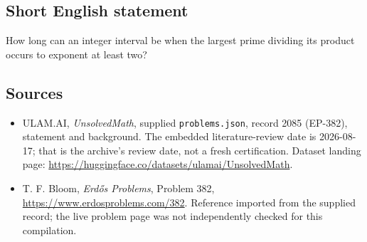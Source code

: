\documentclass[11pt,a4paper]{article}
\begin{document}
\subsection{Short English statement}

How long can an integer interval be when the largest prime dividing its product occurs to exponent at least two?

\subsection{Sources}

{\small

\begin{itemize}

\item[\hypertarget{source:2085:1}{S1}] ULAM.AI, \emph{UnsolvedMath}, supplied \texttt{problems.json}, record 2085 (EP-382), statement and background. The embedded literature-review date is 2026-08-17; that is the archive’s review date, not a fresh certification. Dataset landing page: \url{https://huggingface.co/datasets/ulamai/UnsolvedMath}.

\item[\hypertarget{source:2085:2}{S2}] T. F. Bloom, \emph{Erdős Problems}, Problem 382, \url{https://www.erdosproblems.com/382}. Reference imported from the supplied record; the live problem page was not independently checked for this compilation.

\end{itemize}

}

\label{end:2085}
\end{document}
